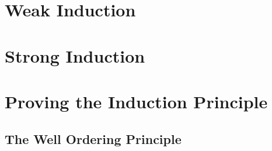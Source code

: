\section{Weak Induction}


\section{Strong Induction}


\section{Proving the Induction Principle}
\subsection{The Well Ordering Principle}
